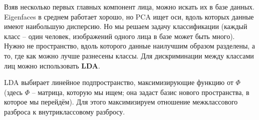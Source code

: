 \documentclass[main.tex]{subfiles}
\begin{document}
Взяв несколько первых главных компонент лица, можно искать их в базе данных. \\

Eigenfaces в среднем работает хорошо, но PCA ищет оси, вдоль которых данные имеют наибольшую дисперсию.
Но мы решаем задачу классификации (каждый класс -- один человек, изображений одного лица в базе может быть много).
Нужно не пространство, вдоль которого данные наилучшим образом разделены, а то, где как можно лучше разнесены классы.
Для дискриминации между классами лиц можно использовать \textbf{LDA}.

LDA выбирает линейное подпространство, максимизирующие функцию от $ \Phi $ (здесь $ \Phi $ -- матрица, которую мы ищем; она задаст базис нового пространства, в которое мы перейдём).
Для этого максимизируем отношение межклассового разброса к внутриклассовому разбросу.
\end{document}

